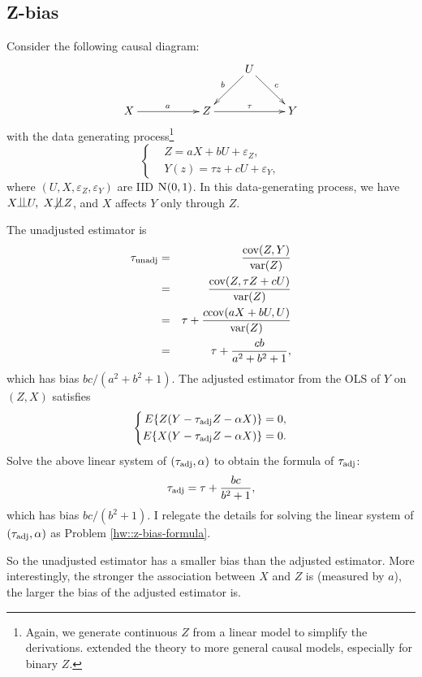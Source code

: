 \subsection{Z-bias}
\label{sec::z-bias}

 

Consider the following causal diagram:
$$
\xymatrix{
&&&U \ar[dl]_b \ar[dr]^c \\
X \ar[rr]^a &&Z\ar[rr]^\tau   && Y 
}
$$
with the data generating process\footnote{Again, we generate continuous $Z$ from a linear model to simplify the derivations.  \citet{ding2017instrumental} extended the theory to more general causal models, especially for binary $Z$. 
}
$$
\left\{ 
\begin{aligned}
&Z=   aX + bU +   \varepsilon_Z , \\
&Y(z)=   \tau z + cU +  \varepsilon_Y ,
\end{aligned}
\right. 
$$
where $(U, X, \varepsilon_Z, \varepsilon_Y) $ are IID  $ \N01$. In this data-generating process, we have
$X\ind U,$ $X\nind Z$, and $X$ affects $Y$ only through $Z$.  

 
The unadjusted estimator is
\begin{eqnarray*}
\tau_\textup{unadj} &=& \frac{ \textup{cov}(Z, Y)  }{  \textup{var}(Z) }  \\
&=& \frac{ \textup{cov}(Z, \tau Z + cU)  }{ \textup{var}(Z) }  \\
&=& \tau + \frac{c \textup{cov}(aX + bU, U)  }{  \textup{var}(Z) }  \\
&=& \tau + \frac{c b }{  a^2 + b^2 + 1} ,
\end{eqnarray*}
which has bias $bc/(a^2 + b^2 + 1)$. The adjusted estimator from the OLS of $Y$ on $(Z,X)$ satisfies
$$
\left\{ 
\begin{aligned}
E\{  Z(Y- \tau_\textup{adj} Z  - \alpha X  )  \} &= 0,\\
E\{  X(Y - \tau_\textup{adj} Z - \alpha X)  \} &= 0.
\end{aligned}
\right. 
$$
Solve the above linear system of $(\tau_\textup{adj}, \alpha)$ to obtain the formula of $  \tau_\textup{adj}$:
\begin{equation}
\label{eq::zbias-result}
  \tau_\textup{adj}  = \tau +  \frac{    bc }{   b^2+1 },
\end{equation}
which has bias $bc/(b^2+1)$. I relegate the details for solving the linear system of $(\tau_\textup{adj}, \alpha)$ as Problem \ref{hw::z-bias-formula}. 

So the unadjusted estimator has a smaller bias than the adjusted estimator. More interestingly, the stronger the association between $X$ and $Z$ is (measured by $a$), the larger the bias of the adjusted estimator is. 


